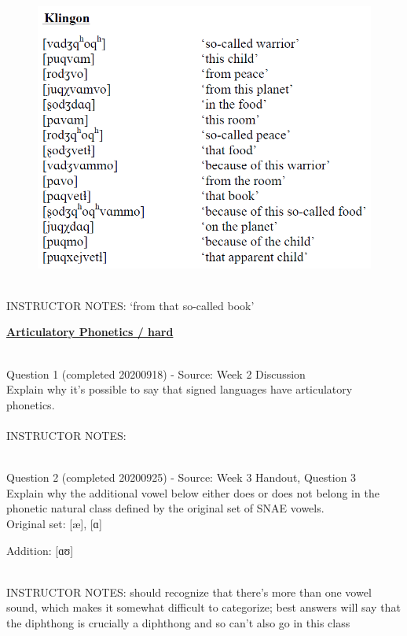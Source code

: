 \documentclass[12pt]{article}
\begin{document}
\begin{figure}[H]
\includegraphics{../images/klingon.png}
\end{figure}

~\\
INSTRUCTOR NOTES: ‘from that so-called book’


\newpage\textbf{\underline{\huge Articulatory Phonetics / hard\\}}

~\\

{\large Question 1} (completed 20200918) - Source: Week 2 Discussion\\

Explain why it's possible to say that signed languages have articulatory phonetics.\\


~\\
INSTRUCTOR NOTES: 


~\\

{\large Question 2} (completed 20200925) - Source: Week 3 Handout, Question 3\\

Explain why the additional vowel below either does or does not belong in the phonetic natural class defined by the original set of SNAE vowels.\\

Original set: {[æ]}, {[ɑ]}

Addition: {[ɑʊ]}


~\\
INSTRUCTOR NOTES: should recognize that there's more than one vowel sound, which makes it somewhat difficult to categorize; best answers will say that the diphthong is crucially a diphthong and so can't also go in this class
\end{document}
